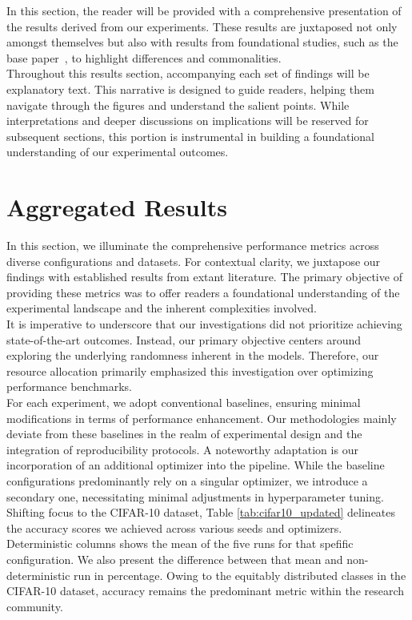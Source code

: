 
In this section, the reader will be provided with a comprehensive presentation of the results derived from our experiments. These results are juxtaposed not only amongst themselves but also with results from foundational studies, such as the base paper~\cite{zhuang2022randomness}, to highlight differences and commonalities.\\

Throughout this results section, accompanying each set of findings will be explanatory text. This narrative is designed to guide readers, helping them navigate through the figures and understand the salient points. While interpretations and deeper discussions on implications will be reserved for subsequent sections, this portion is instrumental in building a foundational understanding of our experimental outcomes.


\section{Aggregated Results}

In this section, we illuminate the comprehensive performance metrics across diverse configurations and datasets. For contextual clarity, we juxtapose our findings with established results from extant literature. The primary objective of providing these metrics was to offer readers a foundational understanding of the experimental landscape and the inherent complexities involved.\\

It is imperative to underscore that our investigations did not prioritize achieving state-of-the-art outcomes. Instead, our primary objective centers around exploring the underlying randomness inherent in the models. Therefore, our resource allocation primarily emphasized this investigation over optimizing performance benchmarks.\\

For each experiment, we adopt conventional baselines, ensuring minimal modifications in terms of performance enhancement. Our methodologies mainly deviate from these baselines in the realm of experimental design and the integration of reproducibility protocols. A noteworthy adaptation is our incorporation of an additional optimizer into the pipeline. While the baseline configurations predominantly rely on a singular optimizer, we introduce a secondary one, necessitating minimal adjustments in hyperparameter tuning.
\clearpage
Shifting focus to the CIFAR-10 dataset, Table \ref{tab:cifar10_updated} delineates the accuracy scores we achieved across various seeds and optimizers. Deterministic columns shows the mean of the five runs for that spefific configuration. We also present the difference between that mean and non-deterministic run in percentage. Owing to the equitably distributed classes in the CIFAR-10 dataset, accuracy remains the predominant metric within the research community.\\

